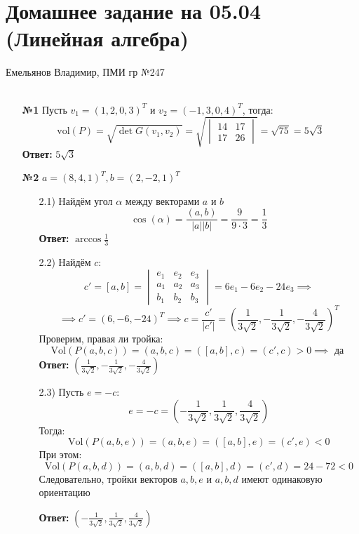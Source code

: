 \documentclass[a4paper]{article}
\newcommand{\vmat}[1]{\begin{vmatrix} #1 \end{vmatrix}}
\renewcommand{\f}[2]{\frac{#1}{#2}}
\renewcommand{\l}{\left(}
\renewcommand{\r}{\right)}
\newcommand{\vol}{\text{vol}}
\newcommand{\Vol}{\text{Vol}}
\begin{document}
\section*{Домашнее задание на 05.04 (Линейная алгебра)}
 {\large Емельянов Владимир, ПМИ гр №247}\\\\
\begin{enumerate}
    \item[\textbf{№1}]Пусть $v_1 = (1, 2, 0, 3)^T$ и $v_2 = (-1, 3, 0, 4)^T$, тогда:
    \[\vol(P) = \sqrt{\det G(v_1, v_2)} = \sqrt{ \vmat{14 & 17 \\ 17 & 26}} 
    = \sqrt{75} = 5\sqrt{3}\]
    \textbf{Ответ:} $5\sqrt{3}$

    \item[\textbf{№2}]$a = (8, 4, 1)^T, b = (2, -2, 1)^T$
    \begin{enumerate}
        \item[2.1)]Найдём угол $\alpha$ между векторами $a$ и $b$
        $$\cos(\alpha) = \f{(a, b)}{|a||b|} = \f{9}{9\cdot 3} = \f{1}{3}$$
        \textbf{Ответ: } $\arccos{\f{1}{3}}$

        \item[2.2)]Найдём $c$:
        $$c' = [a, b] = \vmat{e_1 & e_2 & e_3 \\ a_1 & a_2 & a_3 \\ b_1 & b_2 & b_3} = 
        6e_1 -6e_2 -24e_3 \implies$$
        $$ \implies c' = (6, -6, -24)^T \implies c = \f{c'}{|c'|} = 
        \l \f{1}{3\sqrt{2}}, -\f{1}{3\sqrt{2}}, -\f{4}{3\sqrt{2}} \r^T$$
        Проверим, правая ли тройка:
        $$\Vol (P(a, b, c)) = (a, b, c) = ([a, b], c) = (c', c) > 0 \implies \text{ да }$$
        \textbf{Ответ: } $\l \f{1}{3\sqrt{2}}, -\f{1}{3\sqrt{2}}, -\f{4}{3\sqrt{2}} \r$

        \item[2.3)]Пусть $e = -c$:
        $$e = -c = \l -\f{1}{3\sqrt{2}}, \f{1}{3\sqrt{2}}, \f{4}{3\sqrt{2}} \r$$
        Тогда:
        $$\Vol (P(a, b, e)) = (a, b, e) = ([a, b], e) = (c', e) < 0$$
        При этом:
        $$\Vol (P(a, b, d)) = (a, b, d) = ([a, b], d) = (c', d) = 24-72 < 0$$
        Следовательно, тройки векторов $a, b, e$ и $a, b, d$ имеют одинаковую ориентацию

        \textbf{Ответ: } $\l -\f{1}{3\sqrt{2}}, \f{1}{3\sqrt{2}}, \f{4}{3\sqrt{2}} \r$\\


\end{enumerate}
\end{enumerate}
\end{document}
